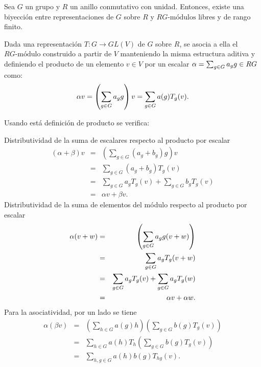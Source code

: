  \begin{proposicion}\label{prop:biyeccionModulos}
 Sea $G$ un grupo y $R$ un anillo conmutativo con unidad. Entonces, existe una biyección entre representaciones de $G$ sobre $R$ y $RG\mbox{-módulos}$ libres y de rango finito. 
 \end{proposicion}
 \begin{proof*}
 Dada una representación $T \colon G \to GL(V)$ de $G$ sobre $R$, se asocia a ella el $RG\mbox{-módulo}$ construido a partir de $V$ manteniendo la misma estructura aditiva y definiendo el producto de un elemento $v \in V$ por un escalar $\alpha = \sum_{g \in G} a_{g} g \in RG$ como: 
 \begin{equation}\label{defproducto}
 \alpha v = \left( \sum_{g \in G} a_{g} g  \right)v = \sum_{g \in G}a(g)T_g(v).
 \end{equation}
 
 Usando está definición de producto se verifica:
 \begin{bulletList}
 \newItem Distributividad de la suma de escalares respecto al producto por escalar \begin{eqnarray*}
  (\alpha + \beta)v &=& \left( \sum_{g \in G}(a_g + b_g)g  \right)v \\
   &=& \sum_{g \in G}(a_g + b_g)T_g(v) \\
   &=& \sum_{g \in G}a_gT_g(v) + \sum_{g \in G}b_gT_g(v) \\
    &=& \alpha v + \beta v .
 \end{eqnarray*}
 \newItem Distributividad de la  suma de elementos del módulo respecto al producto por escalar
 \begin{eqnarray*}
 \alpha(v + w) &=& \left(\sum_{g \in G} a_{g} g(v + w)  \right) \\
  &=& \sum_{g \in G}a_gT_g(v+w) \\
  &=& \sum_{g \in G}a_gT_g(v) + \sum_{g \in G}a_gT_g(w) \\
  &=& \alpha v + \alpha w .
 \end{eqnarray*}
 \newItem Para la asociatividad, por un lado se tiene
 \begin{eqnarray*}
 \alpha(\beta v) &=& \left( \sum_{h \in G}a(g)h \right)\left( \sum_{g \in G}b(g)T_g(v) \right) \\
  &=& \sum_{h \in G}a(h)T_h\left( \sum_{g \in G}b(g)T_g(v)  \right) \\
  &=& \sum_{h, g \in G}a(h)b(g)T_{hg}(v).
 \end{eqnarray*}
 

\end{bulletList}
\end{proof*}
